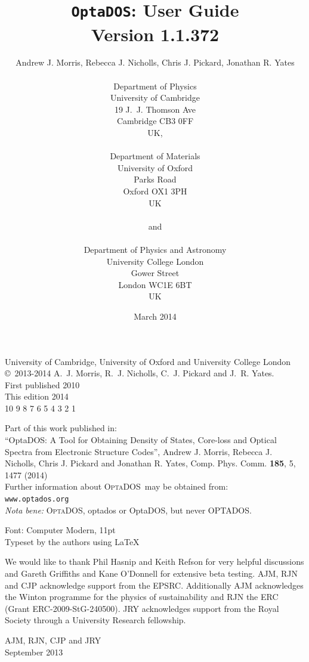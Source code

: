 \documentclass[a4paper,11pt,twoside]{book}
\title{{\huge {\tt OptaDOS}: User Guide}\\ {Version 1.1.372}}
\author{Andrew J. Morris, Rebecca J. Nicholls, Chris J. Pickard, Jonathan R. Yates \\
\\
Department of Physics\\
University of Cambridge\\
19 J.~J. Thomson Ave\\
Cambridge CB3 0FF\\
UK,\\
\\
Department of Materials\\
University of Oxford\\
Parks Road\\
Oxford OX1 3PH\\
UK \\
\\
{\small and} \\
\\
Department of Physics and Astronomy\\
University College London\\
Gower Street\\
London WC1E 6BT\\
UK}
\date{March 2014}
\begin{document}
\newcommand{\optados}{\textsc{OptaDOS}}
\newcommand{\lindos}{\texttt{LinDOS}}
\newcommand{\onetep}{\textsc{onetep}}
\newcommand{\castep}{\textsc{castep}}
\maketitle

 \thispagestyle{empty}

\begin{centering}
\vspace*{40mm}
University of Cambridge, University of Oxford and University College London\\
\vspace{5mm}
\copyright\ 2013-2014 A.~J. Morris, R.~J. Nicholls, C.~J. Pickard and J.~R. Yates.\\
\vspace{5mm}
First published 2010\\
This edition 2014\\
\vspace{5mm}
10 9 8 7 6 5 4 3 2 1
\vspace{5mm}

Part of this work published in:\\
``OptaDOS: A Tool for Obtaining Density of States, Core-loss and Optical Spectra from Electronic Structure Codes'', Andrew J. Morris, Rebecca J. Nicholls, Chris J. Pickard and Jonathan R. Yates, Comp. Phys. Comm. {\bf 185}, 5, 1477 (2014)\\
\vspace{10mm}
Further information about \optados\ may be obtained from:\\ \texttt{www.optados.org}\\

\vspace{10mm}
\emph{Nota bene:} \optados, optados or OptaDOS, but never OPTADOS.

\null\vfill
\noindent
Font: Computer Modern, 11pt\\
Typeset by the authors using \LaTeX\, \\
\end{centering}
\newpage

\setcounter{tocdepth}{1}
\tableofcontents

\newpage
 \thispagestyle{empty}
\vspace*{50mm}
\begin{centering}
We would like to thank Phil Hasnip and Keith Refson for very helpful discussions and Gareth Griffiths and Kane O'Donnell for extensive beta testing.
 AJM, RJN and CJP acknowledge support from the EPSRC. Additionally AJM acknowledges
the Winton programme for the physics of sustainability and RJN the ERC
(Grant ERC-2009-StG-240500).
 JRY acknowledges support from the Royal Society through a University Research fellowship. 
\end{centering}
\begin{flushright}
AJM, RJN, CJP and JRY\\
September 2013
\end{flushright}
\newpage
\end{document}
